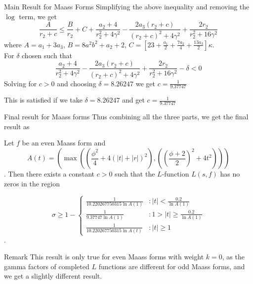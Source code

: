 \documentclass{beamer}
\begin{document}
\begin{frame}{Main Result for Maass Forms}
  Simplifying the above inequality and removing the $\log$ term, we get 
\[
 \frac{A}{r_2+c} \leq \frac{B}{r_2} + C + \frac{a_2+4}{r_2^2+4\gamma^2} - \frac{2a_3(r_2+c)}{(r_2+c)^2 +4\gamma^2} +\frac{2r_2}{r_2^2+16\gamma^2} 
\]
where $A = a_1+3a_3$, $B = 8a^2b^2+a_2+2$, $C = \left[ 23+\frac{a_1}{2}+\frac{7a_2}{4} + \frac{13a_3}{2}\right]\kappa$.\\
For $\delta$ chosen such that \begin{equation} \label{58}
    \frac{a_2+4}{r_2^2+4\gamma^2} - \frac{2a_3(r_2+c)}{(r_2+c)^2 +4\gamma^2} +\frac{2r_2}{r_2^2+16\gamma^2} -\delta <0
\end{equation}
    Solving for $c>0$ and choosing $\delta = 8.26247$ we get $c= \frac{1}{9.37747}$ 

This is satisfied if we take $\delta = 8.26247$ and get $c = \frac{1}{9.37747}$


\end{frame}
\begin{frame}{Final result for Maass forms}
    Thus combining all the three parts, we get the final result as 
    \begin{theorem}
        Let $f$ be an even Maass form and \[A(t) = \left(\max \left(\left( \frac{\phi^2}{4} + 4(|t|+|r|)^2\right),\left( \left(\frac{\phi+2}{2}\right)^2 +4t^2 \right) \right)\right)\]. Then there exists a constant $c > 0$ such that the $L$-function $L(s,f)$ has no zeros in the region
    
        \[
        \sigma \geq 1 - \begin{cases}
        \frac{1}{10.220267750315\ln A(1)} & : |t| < \frac{0.2}{\ln A(1)}\\
        \frac{1}{9.37747\ln A(1)} & : 1>|t| \geq \frac{0.2}{\ln A(1)}\\
        \frac{1}{10.220267750315\ln A(t)} & : |t| \geq 1
        \end{cases}
        \].
    \end{theorem}
\begin{block}{Remark}
    This result is only true for even Maass forms with weight $k = 0$, as the gamma factors of completed $L$ functions are different for odd Maass forms, and we get a slightly different result.
\end{block}
\end{frame}
\end{document}
